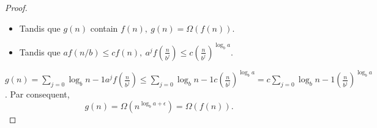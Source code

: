 \documentclass{article}
\begin{document}
\begin{proof}
                    \begin{itemize}
                        \item Tandis que $g(n)$ contain $f(n),\ g(n) = \Omega(f(n))$.
                        \item Tandis que $af(n/b) \leq cf(n), \ a^{j}f(\frac{n}{b^{j}}) \leq c\left(\frac{n}{b^{j}}\right)^{\log_{b}{a}}$. 
                    \end{itemize}
                    $g(n)=\sum_{j=0}{\log_{b}{n-1}}a^{j}f(\frac{n}{b^{j}}) \leq \sum_{j=0}{\log_{b}{n-1}}c\left(\frac{n}{b^{j}}\right)^{\log_{b}{a}} = c\sum_{j=0}{\log_{b}{n-1}}\left(\frac{n}{b^{j}}\right)^{\log_{b}{a}}$.
                    Par consequent, $$g(n) = \Omega(n^{\log_{b}{a}+\epsilon}) = \Omega(f(n)).$$    

            \end{proof}
\end{document}
